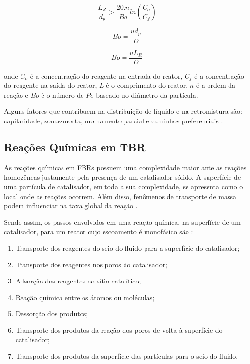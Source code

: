 \begin{equation}
\dfrac{L_{R}}{d_p} > \dfrac{20.n}{Bo}ln\left(\dfrac{C_o}{C_f}\right)
\label{eq:Mearscriterio}
\end{equation}

\begin{equation}
Bo = \dfrac{ud_p}{D}
\label{eq:Bodenstein}
\end{equation}

\begin{equation}
Bo = \dfrac{uL_{R}}{D}
\label{eq:Peclet}
\end{equation}

onde $C_o$ é a concentração do reagente na entrada do reator, $C_f$ é a
concentração do reagente na saída do reator, $L$ é o comprimento do reator, $n$
é a ordem da reação e $Bo$ é o número de $Pe$ baseado no diâmetro da partícula.


Alguns fatores que contribuem na distribuição de líquido e na retromistura são:
capilaridade, zonas-morta, molhamento parcial e caminhos preferenciais
\cite{Ranade2011}.

\subsection{Reações Químicas em TBR} \label{sec:reacoestbr}
 
As reações químicas em FBRs possuem uma complexidade maior ante as reações
homogêneas justamente pela presença de um catalisador sólido. A superfície
de uma partícula de catalisador, em toda a sua complexidade, se apresenta
como o local onde as reações ocorrem. Além disso, fenômenos de transporte
de massa podem influenciar na taxa global da reação \cite{Froment2011}. 

Sendo assim, os passos envolvidos em uma reação química, na superfície de um
catalisador, para um reator cujo escoamento é monofásico são \cite{Froment2011}: 

\begin{enumerate}
\item Transporte dos reagentes do seio do fluido para a superfície
do catalisador;
\item Transporte dos reagentes nos poros do catalisador;
\item Adsorção dos reagentes no sítio catalítico;
\item Reação química entre os átomos ou moléculas;
\item Dessorção dos produtos;
\item Transporte dos produtos da reação dos poros de volta à
superfície do catalisador;
\item Transporte dos produtos da superfície das partículas para o seio do
fluido.
\end{enumerate} 

